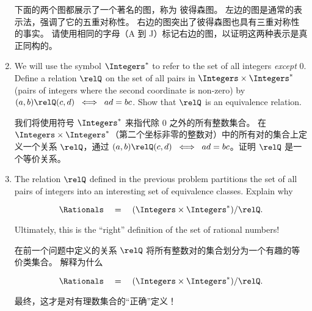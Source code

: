\begin{enumerate}
    \noindent 下面的两个图都展示了一个著名的图，称为
    彼得森图。
    左边的图是通常的表示法，强调了它的五重对称性。
    右边的图突出了彼得森图也具有三重对称性的事实。
    请使用相同的字母（A 到 J）标记右边的图，以证明这两种表示是真正同构的。
    
    \vspace{.2in}
    
    \rule{0pt}{0pt} \hspace{-.75in} 
    
    \vspace{.2in}
    
    \item We will use the symbol $\Integers^{\ast}$ to refer to the set of
    all integers \emph{except} $0$.
    Define a relation $\relQ$ on the set of all pairs in $\Integers \times \Integers^{\ast}$ (pairs of integers where the second coordinate is non-zero) by
    $(a,b) \relQ (c,d) \;
    \iff \; ad=bc$.  Show that $\relQ$ is an 
    equivalence relation.
    
    \noindent  我们将使用符号 $\Integers^{\ast}$ 来指代除 $0$ 之外的所有整数集合。
    在 $\Integers \times \Integers^{\ast}$（第二个坐标非零的整数对）中的所有对的集合上定义一个关系 $\relQ$，通过
    $(a,b) \relQ (c,d) \;
    \iff \; ad=bc$。证明 $\relQ$ 是一个等价关系。
    
    \wbvfill
    
    \workbookpagebreak
    
    \item The relation $\relQ$ defined in the previous problem partitions
    the set of all pairs of integers into an interesting set of equivalence
    classes.
    Explain why 
    
    \[ \Rationals \quad = \quad (\Integers \times \Integers^{\ast}) / \relQ.
    \]
    
    \noindent Ultimately, this is the ``right'' definition of the set 
    of rational numbers!
    
    \noindent  在前一个问题中定义的关系 $\relQ$ 将所有整数对的集合划分为一个有趣的等价类集合。
    解释为什么
    
    \[ \Rationals \quad = \quad (\Integers \times \Integers^{\ast}) / \relQ.
    \]
    
    \noindent 最终，这才是对有理数集合的“正确”定义！
    
    \wbvfill
    
    

\end{enumerate}
